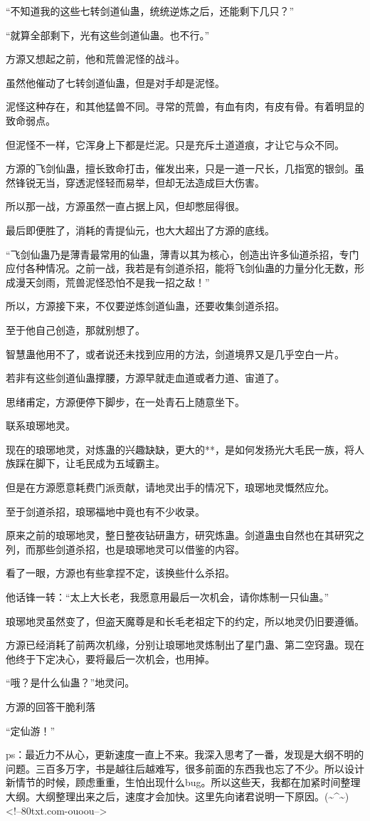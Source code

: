 \begin{this_body}
“不知道我的这些七转剑道仙蛊，统统逆炼之后，还能剩下几只？”

“就算全部剩下，光有这些剑道仙蛊。也不行。”

方源又想起之前，他和荒兽泥怪的战斗。

虽然他催动了七转剑道仙蛊，但是对手却是泥怪。

泥怪这种存在，和其他猛兽不同。寻常的荒兽，有血有肉，有皮有骨。有着明显的致命弱点。

但泥怪不一样，它浑身上下都是烂泥。只是充斥土道道痕，才让它与众不同。

方源的飞剑仙蛊，擅长致命打击，催发出来，只是一道一尺长，几指宽的银剑。虽然锋锐无当，穿透泥怪轻而易举，但却无法造成巨大伤害。

所以那一战，方源虽然一直占据上风，但却憋屈得很。

最后即便胜了，消耗的青提仙元，也大大超出了方源的底线。

“飞剑仙蛊乃是薄青最常用的仙蛊，薄青以其为核心，创造出许多仙道杀招，专门应付各种情况。之前一战，我若是有剑道杀招，能将飞剑仙蛊的力量分化无数，形成漫天剑雨，荒兽泥怪恐怕不是我一招之敌！”

所以，方源接下来，不仅要逆炼剑道仙蛊，还要收集剑道杀招。

至于他自己创造，那就别想了。

智慧蛊他用不了，或者说还未找到应用的方法，剑道境界又是几乎空白一片。

若非有这些剑道仙蛊撑腰，方源早就走血道或者力道、宙道了。

思绪甫定，方源便停下脚步，在一处青石上随意坐下。

联系琅琊地灵。

现在的琅琊地灵，对炼蛊的兴趣缺缺，更大的**，是如何发扬光大毛民一族，将人族踩在脚下，让毛民成为五域霸主。

但是在方源愿意耗费门派贡献，请地灵出手的情况下，琅琊地灵慨然应允。

至于剑道杀招，琅琊福地中竟也有不少收录。

原来之前的琅琊地灵，整日整夜钻研蛊方，研究炼蛊。剑道蛊虫自然也在其研究之列，而那些剑道杀招，也是琅琊地灵可以借鉴的内容。

看了一眼，方源也有些拿捏不定，该换些什么杀招。

他话锋一转：“太上大长老，我愿意用最后一次机会，请你炼制一只仙蛊。”

琅琊地灵虽然变了，但盗天魔尊是和长毛老祖定下的约定，所以地灵仍旧要遵循。

方源已经消耗了前两次机缘，分别让琅琊地灵炼制出了星门蛊、第二空窍蛊。现在他终于下定决心，要将最后一次机会，也用掉。

“哦？是什么仙蛊？”地灵问。

方源的回答干脆利落

“定仙游！”

ps：最近力不从心，更新速度一直上不来。我深入思考了一番，发现是大纲不明的问题。三百多万字，书是越往后越难写，很多前面的东西我也忘了不少。所以设计新情节的时候，顾虑重重，生怕出现什么bug。所以这些天，我都在加紧时间整理大纲。大纲整理出来之后，速度才会加快。这里先向诸君说明一下原因。(\~{}\^{}\~{})<!--80txt.com-ouoou-->

\end{this_body}

